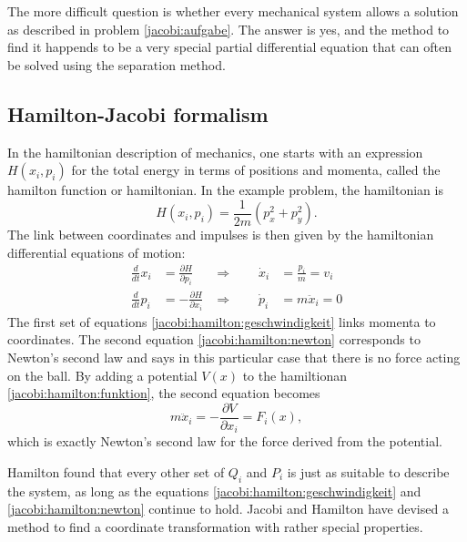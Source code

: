 The more difficult question is whether every mechanical system
allows a solution as described in problem \ref{jacobi:aufgabe}.
The answer is yes, and the method to find it happends to
be a very special partial differential equation that can often
be solved using the separation method.

\subsection{Hamilton-Jacobi formalism}
In the hamiltonian description of mechanics, one starts with an
expression $H(x_i, p_i)$ for the total energy in terms of positions
and momenta, called the hamilton function or hamiltonian.
In the example problem, the hamiltonian is
\begin{equation}
H(x_i,p_i)=\frac1{2m}(p_x^2+p_y^2).
\label{jacobi:hamilton:funktion}
\end{equation}
The link between coordinates and impulses is then given by the
hamiltonian differential equations of motion:
\begin{align}
\frac{d}{dt}x_i&=\frac{\partial H}{\partial p_i}
&\Rightarrow
\qquad \dot x_i&=\frac{p_i}{m}=v_i
\label{jacobi:hamilton:geschwindigkeit}
\\
\frac{d}{dt}p_i&=-\frac{\partial H}{\partial x_i}
&\Rightarrow
\qquad
\dot p_i&=m\ddot x_i=0
\label{jacobi:hamilton:newton}
\end{align}
The first set of equations
\eqref{jacobi:hamilton:geschwindigkeit}
links momenta to coordinates.
The second equation \eqref{jacobi:hamilton:newton} corresponds to
Newton's second law and says in this particular case that there
is no force acting on the ball.
By adding a potential $V(x)$ to the hamiltionan
\eqref{jacobi:hamilton:funktion}, the second equation becomes
\[
m\ddot x_i=-\frac{\partial V}{\partial x_i} = F_i(x),
\]
which is exactly Newton's second law for the force derived from 
the potential.

Hamilton found that every other set of $Q_i$ and $P_i$ is just as
suitable to describe the system, as long as the equations
\eqref{jacobi:hamilton:geschwindigkeit} and \eqref{jacobi:hamilton:newton}
continue to hold.
Jacobi and Hamilton have devised a method to find a coordinate
transformation with rather special properties.

